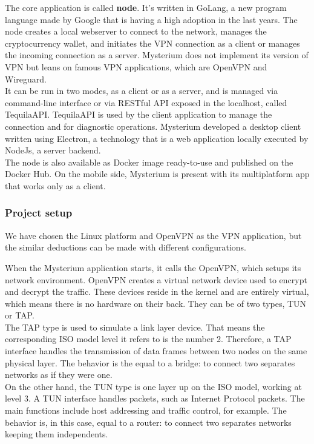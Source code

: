 \documentclass[]{article}
\begin{document}
	The core application is called \textbf{node}. It's written in GoLang, a new program language made by Google that is having a high adoption in the last years. The node creates a local webserver to connect to the network, manages the cryptocurrency wallet, and initiates the VPN connection as a client or manages the incoming connection as a server. Mysterium does not implement its version of VPN but leans on famous VPN applications, which are OpenVPN and Wireguard. \\
	It can be run in two modes, as a client or as a server, and is managed via command-line interface or via RESTful API exposed in the localhost, called TequilaAPI. TequilaAPI is used by the client application to manage the connection and for diagnostic operations. Mysterium developed a desktop client written using Electron, a technology that is a web application locally executed by NodeJs, a server backend.\\
	The node is also available as Docker image ready-to-use and published on the Docker Hub. 
	On the mobile side, Mysterium is present with its multiplatform app that works only as a client.\\

	\subsubsection*{Project setup}

	We have chosen the Linux platform and OpenVPN as the VPN application, but the similar deductions can be made with different configurations.

	When the Mysterium application starts, it calls the OpenVPN, which setups its network environment. OpenVPN creates a virtual network device used to encrypt and decrypt the traffic. These devices reside in the kernel and are entirely virtual, which means there is no hardware on their back. They can be of two types, TUN or TAP.\\
	The TAP type is used to simulate a link layer device. That means the corresponding ISO model level it refers to is the number 2. Therefore, a TAP interface handles the transmission of data frames between two nodes on the same physical layer. The behavior is the equal to a bridge: to connect two separates networks as if they were one.\\
	On the other hand, the TUN type is one layer up on the ISO model, working at level 3. A TUN interface handles packets, such as Internet Protocol packets. The main functions include host addressing and traffic control, for example. The behavior is, in this case, equal to a router: to connect two separates networks keeping them independents.
\end{document}
